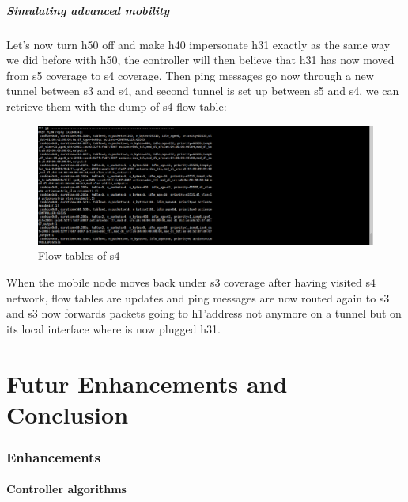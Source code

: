 \documentclass{article}
\begin{document}
\subsubsection{Simulating advanced mobility}

Let's now turn h50 off and make h40 impersonate h31 exactly as the same
way we did before with h50, the controller will then believe that h31
has now moved from s5 coverage to s4 coverage.  Then ping messages go
now through a new tunnel between s3 and s4, and second tunnel is set
up between s5 and s4, we can retrieve them with the dump of s4 flow
table:

\begin{figure}[h!]
  \centering
    \includegraphics[trim = 0mm 0mm 237mm 0mm,clip,scale=0.5]{reportPictures/s4_dumpflows.png}
  \caption{Flow tables of s4}
\end{figure}


When the mobile node moves back under s3 coverage after having
visited s4 network, flow tables are updates and ping messages are now
routed again to s3 and s3 now forwards packets going to h1'address
not anymore on a tunnel but on its local interface where is now
plugged h31.


\part{Futur Enhancements and Conclusion}

\section{Enhancements}

\subsection{Controller algorithms}
\end{document}
